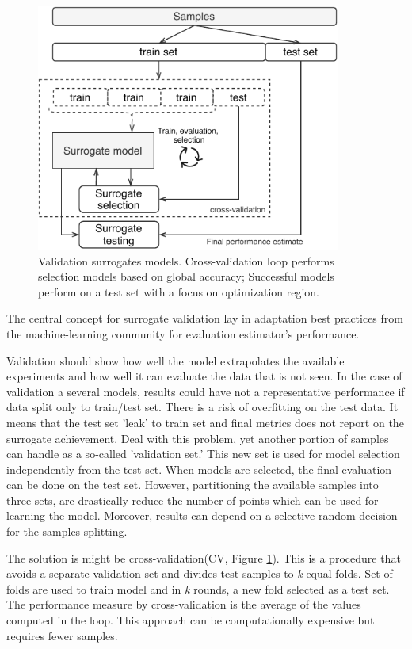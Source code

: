             \begin{figure}
                \centering
                \includegraphics[width=10cm]{content/images/cv}
                \caption[Cross-validation: exploration vs exploitation]{Validation surrogates models. Cross-validation loop performs selection models based on global accuracy; Successful models perform on a test set with a focus on optimization region.} 
                \label{fig:cv}   
            \end{figure}

        The central concept for surrogate validation lay in adaptation best practices from the machine-learning community for evaluation estimator's performance. 

        Validation should show how well the model extrapolates the available experiments and how well it can evaluate the data that is not seen. In the case of validation a several models, results could have not a representative performance if data split only to train/test set.  There is a risk of overfitting on the test data. It means that the test set 'leak' to train set and final metrics does not report on the surrogate achievement. 
        Deal with this problem, yet another portion of samples can handle as a so-called 'validation set.' This new set is used for model selection independently from the test set. When models are selected, the final evaluation can be done on the test set. However, partitioning the available samples into three sets, are drastically reduce the number of points which can be used for learning the model. Moreover, results can depend on a selective random decision for the samples splitting.
        
        The solution is might be cross-validation(CV, Figure \ref{fig:cv}). This is a procedure that avoids a separate validation set and divides test samples to \textit{k} equal folds. Set of folds are used to train model and in \textit{k} rounds, a new fold selected as a test set. The performance measure by cross-validation is the average of the values computed in the loop. This approach can be computationally expensive but requires fewer samples. 
        
